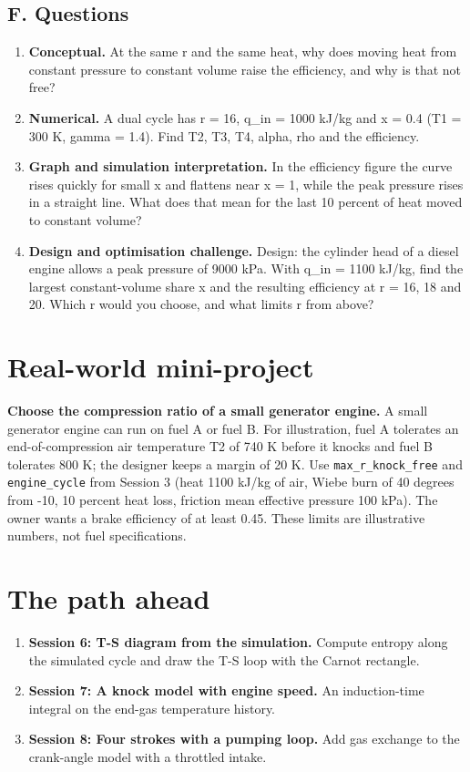 \documentclass[11pt,a4paper]{article}
\begin{document}
\subsection*{F. Questions}
\begin{enumerate}[nosep]
\item \textbf{Conceptual.} At the same r and the same heat, why does moving heat from constant pressure to constant volume raise the efficiency, and why is that not free?
\item \textbf{Numerical.} A dual cycle has r = 16, q\_in = 1000 kJ/kg and x = 0.4 (T1 = 300 K, gamma = 1.4). Find T2, T3, T4, alpha, rho and the efficiency.
\item \textbf{Graph and simulation interpretation.} In the efficiency figure the curve rises quickly for small x and flattens near x = 1, while the peak pressure rises in a straight line. What does that mean for the last 10 percent of heat moved to constant volume?
\item \textbf{Design and optimisation challenge.} Design: the cylinder head of a diesel engine allows a peak pressure of 9000 kPa. With q\_in = 1100 kJ/kg, find the largest constant-volume share x and the resulting efficiency at r = 16, 18 and 20. Which r would you choose, and what limits r from above?
\end{enumerate}
\section{Real-world mini-project}
\textbf{Choose the compression ratio of a small generator engine.} A small generator engine can run on fuel A or fuel B. For illustration, fuel A tolerates an end-of-compression air temperature T2 of 740 K before it knocks and fuel B tolerates 800 K; the designer keeps a margin of 20 K. Use \texttt{max\_r\_knock\_free} and \texttt{engine\_cycle} from Session 3 (heat 1100 kJ/kg of air, Wiebe burn of 40 degrees from -10, 10 percent heat loss, friction mean effective pressure 100 kPa). The owner wants a brake efficiency of at least 0.45. These limits are illustrative numbers, not fuel specifications.

\section{The path ahead}
\begin{enumerate}[nosep]
\item \textbf{Session 6: T-S diagram from the simulation.} Compute entropy along the simulated cycle and draw the T-S loop with the Carnot rectangle.
\item \textbf{Session 7: A knock model with engine speed.} An induction-time integral on the end-gas temperature history.
\item \textbf{Session 8: Four strokes with a pumping loop.} Add gas exchange to the crank-angle model with a throttled intake.
\end{enumerate}
\end{document}
